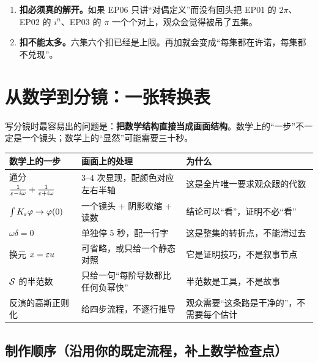 \begin{warnbox}[关于“扣”的两条纪律]
\begin{enumerate}[leftmargin=1.4em,itemsep=0.3em]
\item \textbf{扣必须真的解开。}如果 EP06 只讲“对偶定义”而没有回头把 EP01 的 $2\pi$、EP02 的 $i^{n}$、EP03 的 $\pi$ 一个个对上，观众会觉得被吊了五集。
\item \textbf{扣不能太多。}六集六个扣已经是上限。再加就会变成“每集都在许诺，每集都不兑现”。
\end{enumerate}
\end{warnbox}

\section{从数学到分镜：一张转换表}

写分镜时最容易出的问题是：\textbf{把数学结构直接当成画面结构}。数学上的“一步”不一定是一个镜头；数学上的“显然”可能需要三十秒。

\begin{center}
\small
\renewcommand{\arraystretch}{1.45}
\begin{tabularx}{\textwidth}{@{}L{4.6cm}L{4.8cm}Y@{}}
\toprule
数学上的一步 & 画面上的处理 & 为什么 \\
\midrule
通分 $\frac{1}{\varepsilon-i\omega}+\frac{1}{\varepsilon+i\omega}$ & 3--4 次显现，配颜色对应左右半轴 & 这是全片唯一要求观众跟的代数 \\
$\int K_\varepsilon\varphi\to\varphi(0)$ & 一个镜头 + 阴影收缩 + 读数 & 结论可以“看”，证明不必“看” \\
$\omega\delta=0$ & 单独停 5 秒，配一行字 & 这是整集的转折点，不能滑过去 \\
换元 $x=\varepsilon u$ & 可省略，或只给一个静态对照 & 它是证明技巧，不是叙事节点 \\
$\mathcal{S}$ 的半范数 & 只给一句“每阶导数都比任何负幂快” & 半范数是工具，不是故事 \\
反演的高斯正则化 & 给四步流程，不逐行推导 & 观众需要“这条路是干净的”，不需要每个估计 \\
\bottomrule
\end{tabularx}
\end{center}

\subsection*{制作顺序（沿用你的既定流程，补上数学检查点）}

